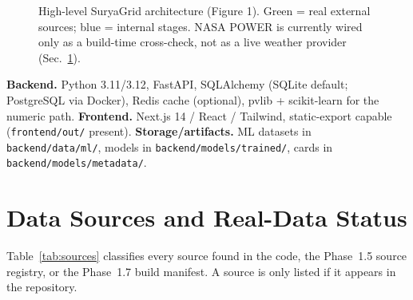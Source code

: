 \documentclass[11pt,a4paper]{article}
\newcommand{\code}[1]{\texttt{\small #1}}
\begin{document}
\begin{figure}[H]
\centering
{}
\caption{High-level SuryaGrid architecture (Figure 1). Green = real external sources;
blue = internal stages. NASA POWER is currently wired only as a build-time cross-check,
not as a live weather provider (Sec.~\ref{sec:datasources}).}
\label{fig:arch}
\end{figure}

\noindent\textbf{Backend.} Python 3.11/3.12, FastAPI, SQLAlchemy (SQLite default;
PostgreSQL via Docker), Redis cache (optional), pvlib + scikit-learn for the numeric
path. \textbf{Frontend.} Next.js 14 / React / Tailwind, static-export capable
(\code{frontend/out/} present). \textbf{Storage/artifacts.} ML datasets in
\code{backend/data/ml/}, models in \code{backend/models/trained/}, cards in
\code{backend/models/metadata/}.

\section{Data Sources and Real-Data Status}
\label{sec:datasources}
Table~\ref{tab:sources} classifies every source found in the code, the Phase~1.5 source
registry, or the Phase~1.7 build manifest. A source is only listed if it appears in the
repository.
\end{document}
